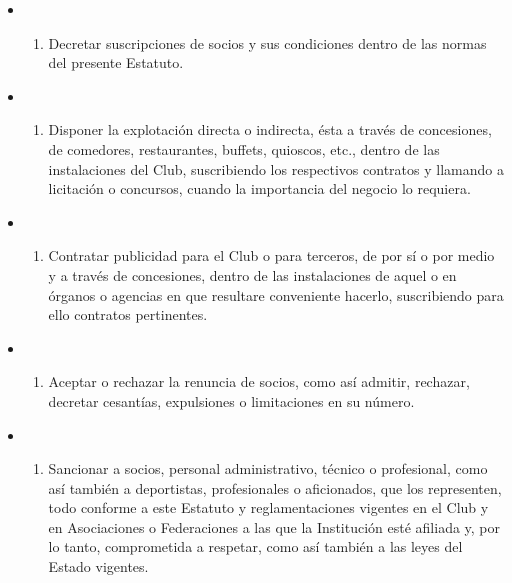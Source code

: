 \documentclass[openany]{book}
\providecommand{\tightlist}{%
  \setlength{\itemsep}{0pt}\setlength{\parskip}{0pt}}
\begin{document}
\begin{itemize}
\begin{itemize}
\begin{enumerate}
    \end{enumerate}
  \item
    \begin{enumerate}
    \def\labelenumi{\alph{enumi})}
    \setcounter{enumi}{14}
    \tightlist
    \item
      Decretar suscripciones de socios y sus condiciones dentro de las normas del presente Estatuto.
    \end{enumerate}
  \item
    \begin{enumerate}
    \def\labelenumi{\alph{enumi})}
    \setcounter{enumi}{15}
    \tightlist
    \item
      Disponer la explotación directa o indirecta, ésta a través de concesiones, de comedores, restaurantes, buffets, quioscos, etc., dentro de las instalaciones del Club, suscribiendo los respectivos contratos y llamando a licitación o concursos, cuando la importancia del negocio lo requiera.
    \end{enumerate}
  \item
    \begin{enumerate}
    \def\labelenumi{\alph{enumi})}
    \setcounter{enumi}{16}
    \tightlist
    \item
      Contratar publicidad para el Club o para terceros, de por sí o por medio y a través de concesiones, dentro de las instalaciones de aquel o en órganos o agencias en que resultare conveniente hacerlo, suscribiendo para ello contratos pertinentes.
    \end{enumerate}
  \item
    \begin{enumerate}
    \def\labelenumi{\alph{enumi})}
    \setcounter{enumi}{17}
    \tightlist
    \item
      Aceptar o rechazar la renuncia de socios, como así admitir, rechazar, decretar cesantías, expulsiones o limitaciones en su número.
    \end{enumerate}
  \item
    \begin{enumerate}
    \def\labelenumi{\alph{enumi})}
    \setcounter{enumi}{18}
    \tightlist
    \item
      Sancionar a socios, personal administrativo, técnico o profesional, como así también a deportistas, profesionales o aficionados, que los representen, todo conforme a este Estatuto y reglamentaciones vigentes en el Club y en Asociaciones o Federaciones a las que la Institución esté afiliada y, por lo tanto, comprometida a respetar, como así también a las leyes del Estado vigentes.

\end{enumerate}
\end{itemize}
\end{itemize}
\end{document}
